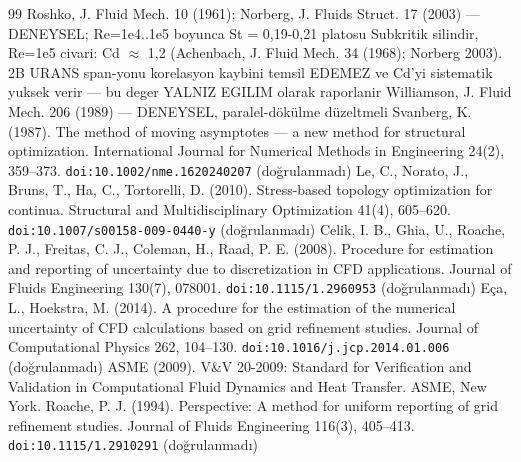 \begin{thebibliography}{99}
 Roshko, J. Fluid Mech. 10 (1961); Norberg, J. Fluids Struct. 17 (2003) — DENEYSEL; Re=1e4..1e5 boyunca St = 0,19-0,21 platosu
 Subkritik silindir, Re=1e5 civari: Cd $\approx$ 1,2 (Achenbach, J. Fluid Mech. 34 (1968); Norberg 2003). 2B URANS span-yonu korelasyon kaybini temsil EDEMEZ ve Cd'yi sistematik yuksek verir — bu deger YALNIZ EGILIM olarak raporlanir
 Williamson, J. Fluid Mech. 206 (1989) — DENEYSEL, paralel-dökülme düzeltmeli
 Svanberg, K. (1987). The method of moving asymptotes — a new method for structural optimization. International Journal for Numerical Methods in Engineering 24(2), 359–373. \texttt{doi:10.1002/nme.1620240207} (doğrulanmadı)
 Le, C., Norato, J., Bruns, T., Ha, C., Tortorelli, D. (2010). Stress-based topology optimization for continua. Structural and Multidisciplinary Optimization 41(4), 605–620. \texttt{doi:10.1007/s00158-009-0440-y} (doğrulanmadı)
 Celik, I. B., Ghia, U., Roache, P. J., Freitas, C. J., Coleman, H., Raad, P. E. (2008). Procedure for estimation and reporting of uncertainty due to discretization in CFD applications. Journal of Fluids Engineering 130(7), 078001. \texttt{doi:10.1115/1.2960953} (doğrulanmadı)
 Eça, L., Hoekstra, M. (2014). A procedure for the estimation of the numerical uncertainty of CFD calculations based on grid refinement studies. Journal of Computational Physics 262, 104–130. \texttt{doi:10.1016/j.jcp.2014.01.006} (doğrulanmadı)
 ASME (2009). V\&V 20-2009: Standard for Verification and Validation in Computational Fluid Dynamics and Heat Transfer. ASME, New York.\quad{\scriptsize[Validasyon çerçevesi: E = S -- D ve u\_val bileşenleri (u\_num, u\_input, u\_D)]}
 Roache, P. J. (1994). Perspective: A method for uniform reporting of grid refinement studies. Journal of Fluids Engineering 116(3), 405–413. \texttt{doi:10.1115/1.2910291} (doğrulanmadı)
\end{thebibliography}
